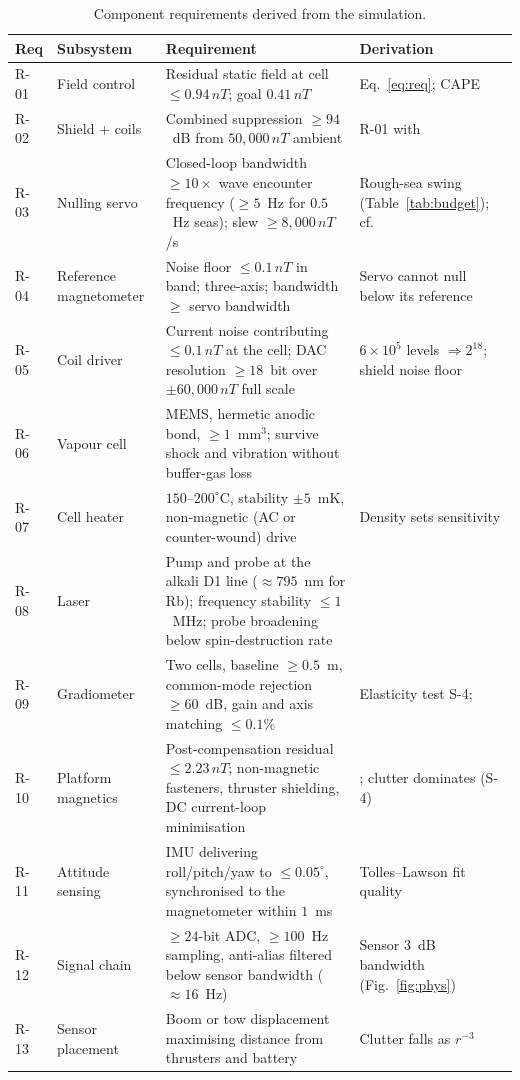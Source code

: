 \documentclass[11pt]{article}
\newcommand{\nT}{\,nT}\newcommand{\pT}{\,pT}\newcommand{\fT}{\,fT}
\begin{document}
\begin{table}[H]\centering\scriptsize
\begin{tabular}{p{0.8cm}p{2.5cm}p{6.6cm}p{4.5cm}}
\toprule
\textbf{Req}&\textbf{Subsystem}&\textbf{Requirement}&\textbf{Derivation}\\
\midrule
R-01&Field control&Residual static field at cell $\leq0.94\nT$; goal $0.41\nT$&Eq.~\eqref{eq:req}; CAPE \cite{borna2022}\\
R-02&Shield + coils&Combined suppression $\geq94$~dB from $50{,}000\nT$ ambient&R-01 with \cite{ncei}\\
R-03&Nulling servo&Closed-loop bandwidth $\geq10\times$ wave encounter frequency ($\geq5$~Hz for $0.5$~Hz seas); slew $\geq8{,}000\nT$/s&Rough-sea swing (Table~\ref{tab:budget}); cf.\ \cite{fang2012,borna2022b}\\
R-04&Reference magnetometer&Noise floor $\leq0.1\nT$ in band; three-axis; bandwidth $\geq$ servo bandwidth&Servo cannot null below its reference \cite{seltzer2004}\\
R-05&Coil driver&Current noise contributing $\leq0.1\nT$ at the cell; DAC resolution $\geq18$~bit over $\pm60{,}000\nT$ full scale&$6\times10^{5}$ levels $\Rightarrow2^{18}$; shield noise floor \cite{lee2008}\\
R-06&Vapour cell&MEMS, hermetic anodic bond, $\geq1$~mm$^3$; survive shock and vibration without buffer-gas loss&\cite{griffith2010,liew2004}\\
R-07&Cell heater&$150$--$200^{\circ}$C, stability $\pm5$~mK, non-magnetic (AC or counter-wound) drive&Density sets sensitivity \cite{allred2002,fang2015}\\
R-08&Laser&Pump and probe at the alkali D1 line ($\approx795$~nm for Rb); frequency stability $\leq1$~MHz; probe broadening below spin-destruction rate&\cite{griffith2010,shah2009}\\
R-09&Gradiometer&Two cells, baseline $\geq0.5$~m, common-mode rejection $\geq60$~dB, gain and axis matching $\leq0.1\%$&Elasticity test S-4; \cite{oehler2024}\\
R-10&Platform magnetics&Post-compensation residual $\leq2.23\nT$; non-magnetic fasteners, thruster shielding, DC current-loop minimisation&\cite{oehler2024}; clutter dominates (S-4)\\
R-11&Attitude sensing&IMU delivering roll/pitch/yaw to $\leq0.05^{\circ}$, synchronised to the magnetometer within $1$~ms&Tolles--Lawson fit quality \cite{tolles1950,gnadt2022,leliak1961}\\
R-12&Signal chain&$\geq24$-bit ADC, $\geq100$~Hz sampling, anti-alias filtered below sensor bandwidth ($\approx16$~Hz)&Sensor 3~dB bandwidth (Fig.~\ref{fig:phys})\\
R-13&Sensor placement&Boom or tow displacement maximising distance from thrusters and battery&Clutter falls as $r^{-3}$ \cite{jackson1998,oehler2024}\\
\bottomrule
\end{tabular}
\caption{Component requirements derived from the simulation.}\label{tab:req}
\end{table}
\end{document}
